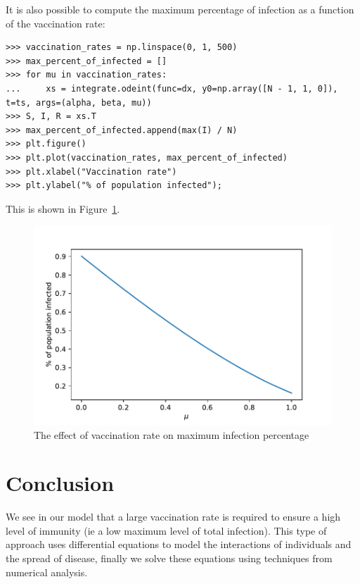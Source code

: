 \documentclass[a4paper]{article}
\begin{document}
It is also possible to compute the maximum percentage of infection as a function
of the vaccination rate:

\begin{verbatim}
>>> vaccination_rates = np.linspace(0, 1, 500)
>>> max_percent_of_infected = []
>>> for mu in vaccination_rates:
...     xs = integrate.odeint(func=dx, y0=np.array([N - 1, 1, 0]), t=ts, args=(alpha, beta, mu))
>>> S, I, R = xs.T
>>> max_percent_of_infected.append(max(I) / N)
>>> plt.figure()
>>> plt.plot(vaccination_rates, max_percent_of_infected)
>>> plt.xlabel("Vaccination rate")
>>> plt.ylabel("% of population infected");
\end{verbatim}

This is shown in Figure~\ref{fig:effect_of_vaccination_rate}.

\begin{figure}[!hbtp]
    \begin{center}
        \includegraphics[width=.6\textwidth]{effect_of_vaccination_rate.pdf}
        \caption{The effect of vaccination rate on maximum infection percentage}
        \label{fig:effect_of_vaccination_rate}
    \end{center}
\end{figure}

\section{Conclusion}

We see in our model that a large vaccination rate is required to ensure a high
level of immunity (ie a low maximum level of total infection). This type of
approach uses differential equations to model the interactions of individuals
and the spread of disease, finally we solve these equations using techniques
from numerical analysis.



\end{document}
